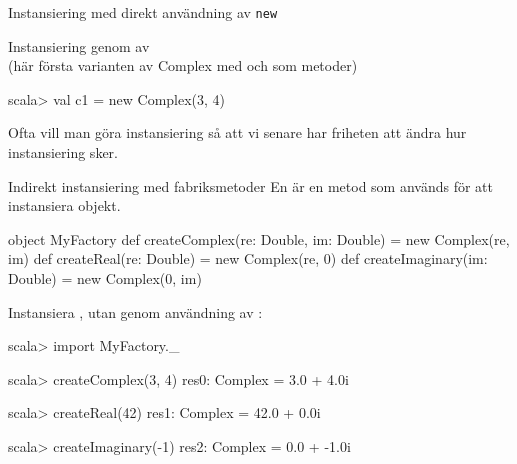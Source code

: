 \begin{Slide}{Instansiering med direkt användning av \texttt{new}}

Instansiering genom  av \\
{\SlideFontSmall (här första varianten av Complex med  och  som metoder)}
\begin{REPLnonum}
scala> val c1 = new Complex(3, 4)
\end{REPLnonum}
\pause
Ofta vill man göra  instansiering så att vi senare har friheten att ändra hur instansiering sker.
\end{Slide}



\begin{Slide}{Indirekt instansiering med fabriksmetoder}\SlideFontSmall
En  är en metod som används för att instansiera objekt.
\begin{Code}[basicstyle=\SlideFontSize{8}{12}\ttfamily\selectfont]
object MyFactory {
  def createComplex(re: Double, im: Double) = new Complex(re, im)
  def createReal(re: Double)                = new Complex(re, 0)
  def createImaginary(im: Double)           = new Complex(0, im)
}
\end{Code}
\pause
Instansiera , utan  genom användning av :
\begin{REPL}
scala> import MyFactory._

scala> createComplex(3, 4)
res0: Complex = 3.0 + 4.0i

scala> createReal(42)
res1: Complex = 42.0 + 0.0i

scala> createImaginary(-1)
res2: Complex = 0.0 + -1.0i
\end{REPL}
\end{Slide}

